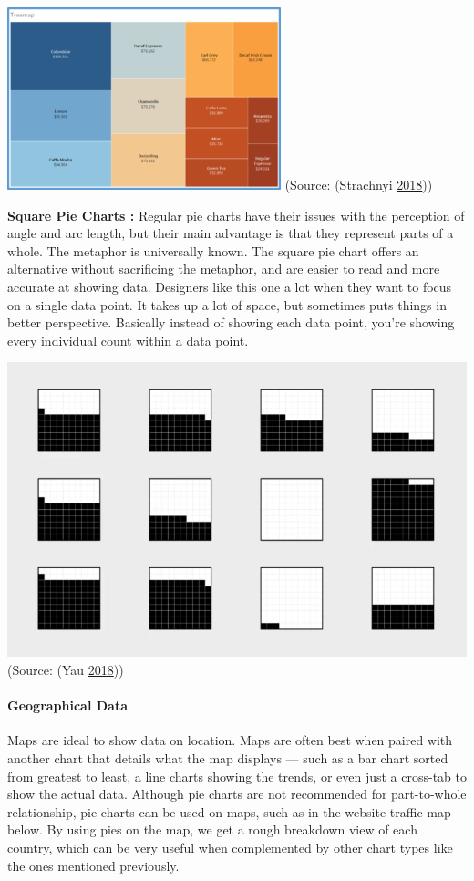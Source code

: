 \documentclass[]{book}
\let\oldparagraph\paragraph
\renewcommand{\paragraph}[1]{\oldparagraph{#1}\mbox{}}
\begin{document}
\includegraphics{images/3.2.2_Treemap.png}
(Source: (Strachnyi \protect\hyperlink{ref-Charts_CheatSheet}{2018}))

\textbf{Square Pie Charts :} Regular pie charts have their issues with the perception of angle and arc length, but their main advantage is that they represent parts of a whole. The metaphor is universally known. The square pie chart offers an alternative without sacrificing the metaphor, and are easier to read and more accurate at showing data. Designers like this one a lot when they want to focus on a single data point. It takes up a lot of space, but sometimes puts things in better perspective. Basically instead of showing each data point, you're showing every individual count within a data point.

\includegraphics{images/3.2.2_Square_pie_chart.png}
(Source: (Yau \protect\hyperlink{ref-Square_Pie_Charts}{2018}))

\hypertarget{geographical-data}{%
\paragraph{Geographical Data}\label{geographical-data}}

Maps are ideal to show data on location. Maps are often best when paired with another chart that details what the map displays --- such as a bar chart sorted from greatest to least, a line charts showing the trends, or even just a cross-tab to show the actual data.
Although pie charts are not recommended for part-to-whole relationship, pie charts can be used on maps, such as in the website-traffic map below. By using pies on the map, we get a rough breakdown view of each country, which can be very useful when complemented by other chart types like the ones mentioned previously.
\end{document}
